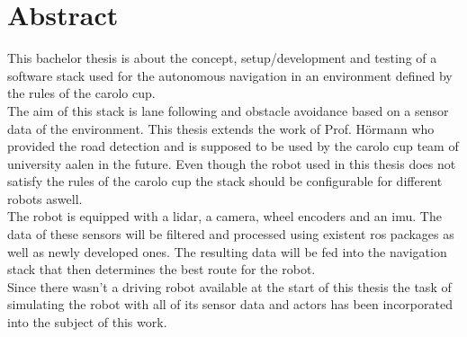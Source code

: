 \chapter*{Abstract}
\label{abstract}
This bachelor thesis is about the concept, setup/development and testing of a software stack used for the autonomous navigation in an environment defined by the rules of the carolo cup.\\

 The aim of this stack is lane following and obstacle avoidance based on a sensor data of the environment. This thesis extends the work of Prof. Hörmann who provided the road detection and is supposed to be used by the carolo cup team of university aalen in the future. Even though the robot used in this thesis does not satisfy the rules of the carolo cup the stack should be configurable for different robots aswell.\\

The robot is equipped with a lidar, a camera, wheel encoders and an imu. The data of these sensors will be filtered and processed using existent ros packages as well as newly developed ones. The resulting data will be fed into the navigation stack that then determines the best route for the robot.\\

Since there wasn't a driving robot available at the start of this thesis the task of simulating the robot with all of its sensor data and actors has been incorporated into the subject of this work. 